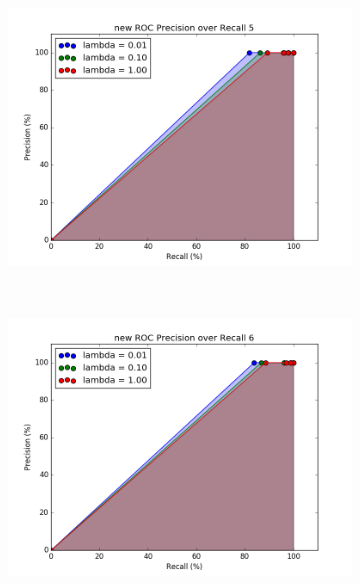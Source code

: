 \documentclass[12pt]{article}
\begin{document}
\begin{figure}[h!]
    \begin{subfigure}[t]{0.5\textwidth}
        \centering
        \includegraphics[width=1.\textwidth]{graphs/problem4_ROC5}
        \caption{}
    \end{subfigure}%
    ~ 
    \begin{subfigure}[t]{0.5\textwidth}
        \centering
        \includegraphics[width=1.\textwidth]{graphs/problem4_ROC6}
        \caption{}
    \end{subfigure}%
    

\end{figure}
\end{document}
